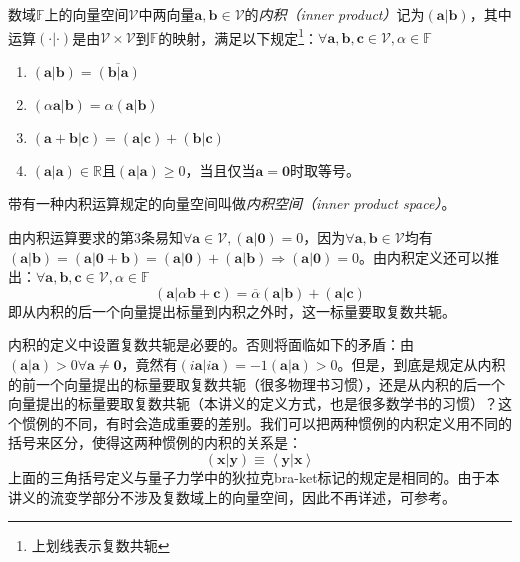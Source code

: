\documentclass[../main.tex]{subfiles}
\begin{document}
\begin{definition}[内积]\label{def:II.2.8}
    数域$\mathbb{F}$上的向量空间$\mathcal{V}$中两向量$\mathbf{a},\mathbf{b}\in\mathcal{V}$的\emph{内积（inner product）}记为$\left(\mathbf{a}|\mathbf{b}\right)$，其中运算$\left(\cdot|\cdot\right)$是由$\mathcal{V}\times\mathcal{V}$到$\mathbb{F}$的映射，满足以下规定\footnote{上划线表示复数共轭}：$\forall\mathbf{a},\mathbf{b},\mathbf{c}\in\mathcal{V},\alpha\in\mathbb{F}$
    \begin{enumerate}
        \item $\left(\mathbf{a}|\mathbf{b}\right)=\overline{\left(\mathbf{b}|\mathbf{a}\right)}$
        \item $\left(\alpha\mathbf{a}|\mathbf{b}\right)=\alpha\left(\mathbf{a}|\mathbf{b}\right)$
        \item $\left(\mathbf{a}+\mathbf{b}|\mathbf{c}\right)=\left(\mathbf{a}|\mathbf{c}\right)+\left(\mathbf{b}|\mathbf{c}\right)$
        \item $\left(\mathbf{a}|\mathbf{a}\right)\in\mathbb{R}$且$\left(\mathbf{a}|\mathbf{a}\right)\geq0$，当且仅当$\mathbf{a}=\mathbf{0}$时取等号。
    \end{enumerate}
    带有一种内积运算规定的向量空间叫做\emph{内积空间（inner product space）}。
\end{definition}

由内积运算要求的第3条易知$\forall\mathbf{a}\in\mathcal{V},\left(\mathbf{a}|\mathbf{0}\right)=0$，因为$\forall\mathbf{a},\mathbf{b}\in\mathcal{V}$均有$\left(\mathbf{a}|\mathbf{b}\right)=\left(\mathbf{a}|\mathbf{0}+\mathbf{b}\right)=\left(\mathbf{a}|\mathbf{0}\right)+\left(\mathbf{a}|\mathbf{b}\right)\Rightarrow\left(\mathbf{a}|\mathbf{0}\right)=0$。由内积定义还可以推出：$\forall\mathbf{a},\mathbf{b},\mathbf{c}\in\mathcal{V},\alpha\in\mathbb{F}$
\[\left(\mathbf{a}|\alpha\mathbf{b}+\mathbf{c}\right)=\overline{\alpha}\left(\mathbf{a}|\mathbf{b}\right)+\left(\mathbf{a}|\mathbf{c}\right)\]
即从内积的后一个向量提出标量到内积之外时，这一标量要取复数共轭。

内积的定义中设置复数共轭是必要的。否则将面临如下的矛盾：由$\left(\mathbf{a}|\mathbf{a}\right)>0\forall\mathbf{a}\neq\mathbf{0}$，竟然有$\left(i\mathbf{a}|i\mathbf{a}\right)=-1\left(\mathbf{a}|\mathbf{a}\right)>0$。但是，到底是规定从内积的前一个向量提出的标量要取复数共轭（很多物理书习惯），还是从内积的后一个向量提出的标量要取复数共轭（本讲义的定义方式，也是很多数学书的习惯）？这个惯例的不同，有时会造成重要的差别。我们可以把两种惯例的内积定义用不同的括号来区分，使得这两种惯例的内积的关系是：
\[\left(\mathbf{x}|\mathbf{y}\right)\equiv\left\langle\mathbf{y}|\mathbf{x}\right\rangle\]
上面的三角括号定义与量子力学中的狄拉克bra-ket标记的规定是相同的。由于本讲义的流变学部分不涉及复数域上的向量空间，因此不再详述，可参考\cite[\S1.3.1]{Hassani1999}。
\end{document}
